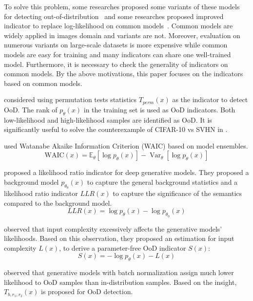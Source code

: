\documentclass[letterpaper]{article} %
\begin{document}
To solve this problem, some researches proposed some variants of these models for detecting out-of-distribution~\cite{che2019deep} and some researches proposed improved indicator to replace log-likelihood on common models~\cite{serra2019input}. Common models are widely applied in images domain and variants are not. Moreover, evaluation on numerous variants on large-scale datasets is more expensive while common models are easy for training and many indicators can share one well-trained model. Furthermore, it is necessary to check the generality of indicators on common models. By the above motivations, this paper focuses on the indicators based on common models. 

\cite{song2017pixeldefend} considered using permutation tests statistics $T_{perm}(x)$ as the indicator to detect OoD. The rank of $p_\theta(x)$ in the training set is used as OoD indicators. Both low-likelihood and high-likelihood samples are identified as OoD. It is significantly useful to solve the counterexample of CIFAR-10 vs SVHN in \cite{nalisnick2019do}. 

\cite{choi2018waic} used Watanabe Akaike Information Criterion (WAIC) based on model ensembles.
\begin{equation}
	\text{WAIC}(x) = \mathbb{E}_{\theta} [\log p_\theta(x)] - \operatorname{Var}_{\theta} [\log p_\theta(x)]
\end{equation}

\cite{ren2019likelihood} proposed a likelihood ratio indicator for deep generative models. They proposed a background model $p_{\theta_0}(x)$ to capture the general background statistics and a likelihood ratio indicator $LLR(x)$ to capture the significance of the semantics compared to the background model. 
\begin{equation}
LLR(x) = \log p_\theta(x) - \log p_{\theta_0}(x)
\end{equation}

\cite{serra2019input} observed that input complexity excessively affects the generative models' likelihoods. Based on this observation, they proposed an estimation for input complexity $L(x)$, to derive a parameter-free OoD indicator $S(x)$:
\begin{equation}
	S(x) = -\log p_\theta(x) - L(x)
\end{equation}

\cite{song2019unsupervised} observed that generative models with batch normalization assign much lower likelihood to OoD samples than in-distribution samples. 
Based on the insight, $T_{b, r_1, r_2}(x)$ is proposed for OoD detection. 
\end{document}
